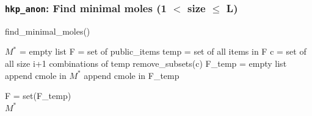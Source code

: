 \documentclass{beamer}
\begin{document}

\begin{frame}[fragile]
\frametitle{\texttt{hkp\_anon}: Find minimal moles (1 $<$ size $\leq$ L)}
\begin{algorithm}[H]
\caption{find\_minimal\_moles()}\label{alg:cap}
\begin{algorithmic}
\State $M^{*}$ = empty list
\State F = set of public\_items 
  
    \State temp = set of all items in F  
    \State c = set of all size i+1 combinations of temp
    \State remove\_subsets(c) 
    \State F\_temp = empty list
      
            \State append cmole in $M^{*}$ 
        \Else 
            \State append cmole in F\_temp  
\end{algorithmic}
\begin{algorithmic}
    \State F = set(F\_temp)\\
    \Return $M^{*}$    
\end{algorithmic}
\end{algorithm}

\end{frame}
\end{document}
